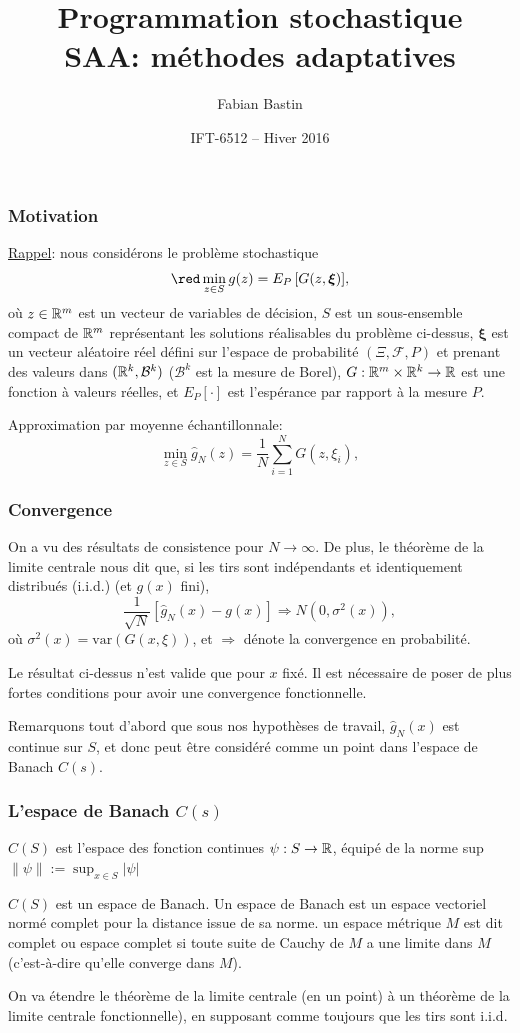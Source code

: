 \documentclass[french]{beamer}
\title[Méthodes adaptatives]{Programmation stochastique\\SAA: méthodes adaptatives}
\author{Fabian Bastin}
\date{IFT-6512 -- Hiver 2016}
\def\bxi{\boldsymbol\xi}
\begin{document}
\frame{\titlepage}

\begin{frame}
\frametitle{Motivation}

\underline{Rappel}: nous considérons le problème stochastique
\[
{\red \min_{z \in S} g(z) = E_P \left[ G(z, \bxi) \right]},
\]
où $z \in \mathbb{R}^m$ est un vecteur de variables de décision, $S$ est un
sous-ensemble compact de $\mathbb{R}^m$ représentant les solutions
réalisables du problème ci-dessus, $\bxi$ est un vecteur aléatoire
réel défini sur l'espace de probabilité $( \Xi, \mathcal{F}, P )$ et
prenant des valeurs dans $( \mathbb{R}^k, \mathcal{B}^k )$ ($\mathcal{B}^k$
est la mesure de Borel),
$G: \mathbb{R}^m \times \mathbb{R}^k \rightarrow \mathbb{R}$ est une fonction à valeurs
réelles, et $E_P[\cdot]$ est l'espérance par rapport à la mesure $P$.

\mbox{}

Approximation par moyenne échantillonnale:
\[
\min_{z \in S} \hat{g}_N(z) = \frac{1}{N} \sum_{i = 1}^N G (z, \xi_i),
\]

\end{frame}

\begin{frame}
\frametitle{Convergence}

On a vu des résultats de consistence pour $N \rightarrow \infty$.
De plus, le théorème de la limite centrale nous dit que, si les tirs
sont indépendants et identiquement distribués (i.i.d.) (et $g(x)$ fini),
\[
\frac{1}{\sqrt{N}} [ \hat{g}_N(x) - g(x) ] \Rightarrow N(0, \sigma^2(x)),
\]
où $\sigma^2(x) = \mbox{var}(G(x,\xi))$, et $\Rightarrow$ dénote la
convergence en probabilité.

\mbox{}

Le résultat ci-dessus n'est valide que pour $x$ fixé.
Il est nécessaire de poser de plus fortes conditions pour avoir une
convergence fonctionnelle.

\mbox{}

Remarquons tout d'abord que sous nos hypothèses de travail,
$\hat{g}_N(x)$ est continue sur $S$, et donc peut être considéré comme
un point dans l'espace de Banach $C(s)$.

\end{frame}

\begin{frame}
\frametitle{L'espace de Banach $C(s)$}

$C(S)$ est l'espace des fonction continues $\psi: S \rightarrow \mathbb{R}$,
équipé de la norme sup $\| \psi \| := \sup_{x \in S}| \psi |$

\mbox{}

$C(S)$ est un espace de Banach.
Un espace de Banach est un espace vectoriel normé complet pour la
distance issue de sa norme.
un espace métrique $M$ est dit complet ou espace complet si toute
suite de Cauchy de $M$ a une limite dans $M$ (c'est-à-dire qu'elle
converge dans $M$).

\mbox{}

On va étendre le théorème de la limite centrale (en un point) à un
théorème de la limite centrale fonctionnelle), en supposant comme
toujours que les tirs sont i.i.d.

\mbox{}

\end{frame}
\end{document}
